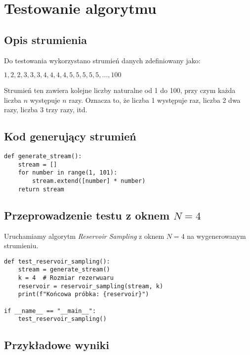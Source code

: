 \documentclass{article}
\begin{document}
\section{Testowanie algorytmu}

\subsection{Opis strumienia}

Do testowania wykorzystano strumień danych zdefiniowany jako:

\begin{center}
$1, 2, 2, 3, 3, 3, 4, 4, 4, 4, 5, 5, 5, 5, 5, \dots, 100$
\end{center}

Strumień ten zawiera kolejne liczby naturalne od 1 do 100, przy czym każda liczba $n$ występuje $n$ razy. Oznacza to, że liczba 1 występuje raz, liczba 2 dwa razy, liczba 3 trzy razy, itd.

\subsection{Kod generujący strumień}

\begin{lstlisting}[style=pystyle, caption=Generowanie strumienia danych]
def generate_stream():
    stream = []
    for number in range(1, 101):
        stream.extend([number] * number)
    return stream
\end{lstlisting}

\subsection{Przeprowadzenie testu z oknem $N = 4$}

Uruchamiamy algorytm \textit{Reservoir Sampling} z oknem $N = 4$ na wygenerowanym strumieniu.

\begin{lstlisting}[style=pystyle, caption=Przeprowadzenie testu]
def test_reservoir_sampling():
    stream = generate_stream()
    k = 4  # Rozmiar rezerwuaru
    reservoir = reservoir_sampling(stream, k)
    print(f"Końcowa próbka: {reservoir}")

if __name__ == "__main__":
    test_reservoir_sampling()
\end{lstlisting}

\subsection{Przykładowe wyniki}
\end{document}
